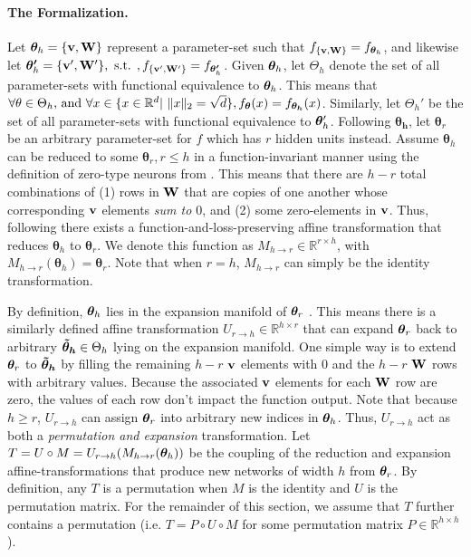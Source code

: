 \paragraph{The Formalization. }
Let $\bm{\theta}_h=\{{\mathbf{v}},{\mathbf{W}}\}$ represent a parameter-set such that $f_{\{{\mathbf{v}},{\mathbf{W}}\}}=f_{\bm{\theta}_h}$, and likewise let $\bm{\theta'}_h=\{{\mathbf{v'}},{\mathbf{W'}}\}, \text{ s.t. }, f_{\{{\mathbf{v'}},{\mathbf{W'}}\}}=f_{\bm{\theta'}_h}$. 
Given $\bm{\theta}_h$, let $\Theta_h$ denote the set of all parameter-sets with functional equivalence to $\bm{\theta}_h$.
This means that $\forall \theta\in\Theta_h\text{, and }\forall x\in\{x\in\mathbb{R}^d|\  \lVert x\rVert_2=\sqrt{d}\}, f_{\bm{\theta}}(x)=f_{\bm{\bm{\theta}_h}}(x)$.
Similarly, let $\Theta_h'$ be the set of all parameter-sets with functional equivalence to $\bm{\theta}_h'$.
Following $\bm{\theta_h}$, let $\bm{\theta}_r$ be an arbitrary parameter-set for $f$ which has $r$ hidden units instead. Assume $\bm{\theta}_h$ can be reduced to some $\bm{\theta}_r, r\leq h$ in a function-invariant manner using the definition of zero-type neurons from \citep{simsek2021geometry}. This means that there are $h-r$ total combinations of (1) rows in ${\mathbf{W}}$ that are copies of one another whose corresponding ${\mathbf{v}}$ elements \textit{sum to $0$}, and (2) some zero-elements in ${\mathbf{v}}$. Thus, following \citet{simsek2021geometry} there exists a function-and-loss-preserving affine transformation that reduces $\bm{\theta}_h$ to $\bm{\theta}_r$. 
We denote this function as $M_{h\rightarrow r}\in\mathbb{R}^{r\times h}$, with $M_{h\rightarrow r}(\bm{\theta}_h)=\bm{\theta}_r$. Note that when $r=h$, $M_{h\rightarrow r}$ can simply be the identity transformation.

By definition, $\bm{\theta}_h$ lies in the expansion manifold of $\bm{\theta}_r$ \citep{simsek2021geometry}. 
This means there is a similarly defined affine transformation $U_{r\rightarrow h}\in\mathbb{R}^{h\times r}$ that can expand $\bm{\theta}_r$ back to arbitrary $\bm{\Tilde{\theta}_h}\in\Theta_h$ lying on the expansion manifold. 
One simple way is to extend $\bm{\theta}_r$ to $\bm{\Tilde{\theta}_h}$ by filling the remaining $h-r$ ${\mathbf{v}}$ elements with $0$ and the $h-r$ ${\mathbf{W}}$ rows with arbitrary values. 
Because the associated ${\mathbf{v}}$ elements for each ${\mathbf{W}}$ row are zero, the values of each row don't impact the function output.
Note that because $h\geq r$, $U_{r\rightarrow h}$ can assign $\bm{\theta}_r$ into arbitrary new indices in $\bm{\theta}_h$. 
Thus, $U_{r\rightarrow h}$ act as both a \textit{permutation and expansion} transformation. 
Let $T=U\circ M=U_{r\rightarrow h}(M_{h\rightarrow r}(\bm{\theta}_h))$ be the coupling of the reduction and expansion affine-transformations that produce new networks of width $h$ from $\bm{\theta}_r$. 
By definition, any $T$ is a permutation when $M$ is the identity and $U$ is the permutation matrix. 
For the remainder of this section, we assume that $T$ further contains a permutation (i.e. $T=P\circ U\circ M$ for some permutation matrix $P\in\mathbb{R}^{h\times h}$).

